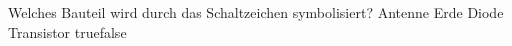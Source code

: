     {Welches Bauteil wird durch das Schaltzeichen symbolisiert?}
    {Antenne}
    {Erde}
    {Diode}
    {Transistor}
    {true}{false}